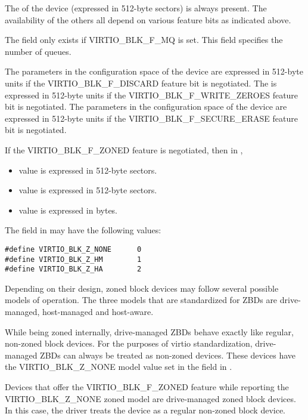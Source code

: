 The  of the device (expressed in 512-byte sectors) is always
present. The availability of the others all depend on various feature
bits as indicated above.

The field  only exists if VIRTIO_BLK_F_MQ is set. This field specifies
the number of queues.

The parameters in the configuration space of the device 
 are expressed in 512-byte units if the
VIRTIO_BLK_F_DISCARD feature bit is negotiated. The 
is expressed in 512-byte units if the VIRTIO_BLK_F_WRITE_ZEROES feature
bit is negotiated. The parameters in the configuration space of the device
  are expressed
in 512-byte units if the VIRTIO_BLK_F_SECURE_ERASE feature bit is negotiated.

If the VIRTIO_BLK_F_ZONED feature is negotiated, then in
,
\begin{itemize}
\item {} value is expressed in 512-byte sectors.
\item {} value is expressed in 512-byte sectors.
\item {} value is expressed in bytes.
\end{itemize}

The  field in  may have the following values:

\begin{lstlisting}
#define VIRTIO_BLK_Z_NONE      0
#define VIRTIO_BLK_Z_HM        1
#define VIRTIO_BLK_Z_HA        2
\end{lstlisting}

Depending on their design, zoned block devices may follow several possible
models of operation. The three models that are standardized for ZBDs are
drive-managed, host-managed and host-aware.

While being zoned internally, drive-managed ZBDs behave exactly like regular,
non-zoned block devices. For the purposes of virtio standardization,
drive-managed ZBDs can always be treated as non-zoned devices. These devices
have the VIRTIO_BLK_Z_NONE model value set in the  field in
.

Devices that offer the VIRTIO_BLK_F_ZONED feature while reporting the
VIRTIO_BLK_Z_NONE zoned model are drive-managed zoned block devices. In this
case, the driver treats the device as a regular non-zoned block device.

